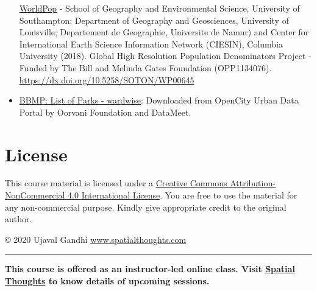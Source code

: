 \documentclass[
  12pt,
  a4paper]{article}
\begin{document}
\begin{itemize}
  \href{https://www.worldpop.org/geodata/summary?id=6527}{WorldPop} -
  School of Geography and Environmental Science, University of
  Southampton; Department of Geography and Geosciences, University of
  Louisville; Departement de Geographie, Universite de Namur) and Center
  for International Earth Science Information Network (CIESIN), Columbia
  University (2018). Global High Resolution Population Denominators
  Project - Funded by The Bill and Melinda Gates Foundation
  (OPP1134076). \url{https://dx.doi.org/10.5258/SOTON/WP00645}
\item
  \href{http://opencity.in/documents/bbmp-list-of-parks-wardwise}{BBMP:
  List of Parks - wardwise}: Downloaded from OpenCity Urban Data Portal
  by Oorvani Foundation and DataMeet.
\end{itemize}

\hypertarget{license}{%
\section{License}\label{license}}

This course material is licensed under a
\href{https://creativecommons.org/licenses/by-nc/4.0/}{Creative Commons
Attribution-NonCommercial 4.0 International License}. You are free to
use the material for any non-commercial purpose. Kindly give appropriate
credit to the original author.

© 2020 Ujaval Gandhi
\href{https://spatialthoughts.com}{www.spatialthoughts.com}

\begin{center}\rule{0.5\linewidth}{0.5pt}\end{center}

\textbf{This course is offered as an instructor-led online class. Visit
\href{https://spatialthoughts.com/events/}{Spatial Thoughts} to know
details of upcoming sessions.}
\end{document}
